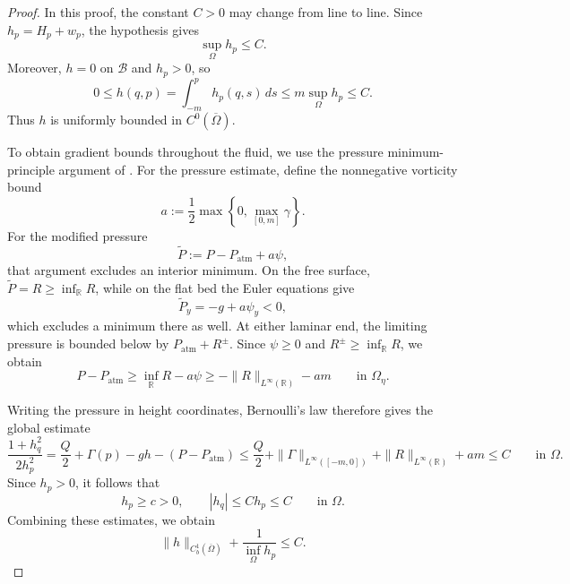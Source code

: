 \documentclass[12pt,letterpaper]{amsart}
\numberwithin{equation}{section}
\begin{document}
\begin{proof}
	In this proof, the constant $C>0$ may change from {line to line. Since} $h_p=H_p+w_p$, the hypothesis gives
\[
    \sup_{\Omega}h_p\le C.
\]
Moreover, $h=0$ on $\mathcal B$ and $h_p>0$, so
\[
    0\le h(q,p)=\int_{-m}^{p}h_p(q,s)\,ds
    \le m\sup_{\Omega}h_p\le C.
\]
Thus $h$ is uniformly bounded in $C^0(\overline\Omega)$.

To obtain gradient bounds throughout the fluid, we use the
pressure minimum-principle argument of \cite{varjde}.
{For the pressure estimate, define the nonnegative vorticity bound}
\[
    a:=\frac12\max\left\{0,\max_{[0,m]}\gamma\right\}.
\]
For the modified pressure
\[
    \tilde P:=P-P_{\mathrm{atm}}+a\psi,
\]
that argument excludes an interior minimum. On the free surface,
$\tilde P=R\ge\inf_{\mathbb R}R$, while on the flat bed the Euler equations give
\[
   \tilde P_y=-g+a\psi_y<0,
\]
which excludes a minimum there as well. At either laminar end,
the limiting pressure is  bounded below by
$P_{\mathrm{atm}}+R^\pm$. Since $\psi\ge0$ and
$R^\pm\ge\inf_{\mathbb R}R$,
{we obtain}
\[
    P-P_{\mathrm{atm}}
    \ge \inf_{\mathbb R}R-a\psi
    \ge -\|R\|_{L^\infty(\mathbb R)}-am
    \qquad\text{in }\Omega_\eta.
\]

Writing the pressure in height coordinates, Bernoulli's law therefore
gives the global estimate
\[
    \frac{1+h_q^2}{2h_p^2}
    =\frac Q2+\Gamma(p)-gh-(P-P_{\mathrm{atm}})
    \le
    \frac Q2+\|\Gamma\|_{L^\infty([-m,0])}
    +\|R\|_{L^\infty(\mathbb R)}+am
    \le C
    \qquad\text{in }\Omega.
\]
Since $h_p>0$, it follows that
\[
    h_p\ge c>0,
    \qquad
    |h_q|\le C h_p\le C
    \qquad\text{in }\Omega.
\]
Combining these estimates, we obtain
\[
    \|h\|_{C_b^1(\overline\Omega)}
    +\frac{1}{\inf_{\Omega}h_p}
    \le C.
\]


\end{proof}
\end{document}
